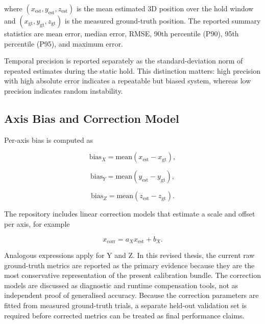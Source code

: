 where $(x_{\text{est}}, y_{\text{est}}, z_{\text{est}})$ is the mean estimated 3D position over the hold window and $(x_{\text{gt}}, y_{\text{gt}}, z_{\text{gt}})$ is the measured ground-truth position. The reported summary statistics are mean error, median error, RMSE, 90th percentile (P90), 95th percentile (P95), and maximum error.

Temporal precision is reported separately as the standard-deviation norm of repeated estimates during the static hold. This distinction matters: high precision with high absolute error indicates a repeatable but biased system, whereas low precision indicates random instability.

\subsection{Axis Bias and Correction Model}

Per-axis bias is computed as

\begin{equation}
\text{bias}_X = \text{mean}(x_{\text{est}} - x_{\text{gt}}),
\label{eqn:4_2_bias_x}
\end{equation}

\begin{equation}
\text{bias}_Y = \text{mean}(y_{\text{est}} - y_{\text{gt}}),
\label{eqn:4_3_bias_y}
\end{equation}

\begin{equation}
\text{bias}_Z = \text{mean}(z_{\text{est}} - z_{\text{gt}}).
\label{eqn:4_4_bias_z}
\end{equation}

The repository includes linear correction models that estimate a scale and offset per axis, for example

\begin{equation}
x_{\text{corr}} = a_X x_{\text{est}} + b_X .
\label{eqn:4_5_x_correction}
\end{equation}

Analogous expressions apply for Y and Z. In this revised thesis, the current raw ground-truth metrics are reported as the primary evidence because they are the most conservative representation of the present calibration bundle. The correction models are discussed as diagnostic and runtime compensation tools, not as independent proof of generalised accuracy. Because the correction parameters are fitted from measured ground-truth trials, a separate held-out validation set is required before corrected metrics can be treated as final performance claims.
